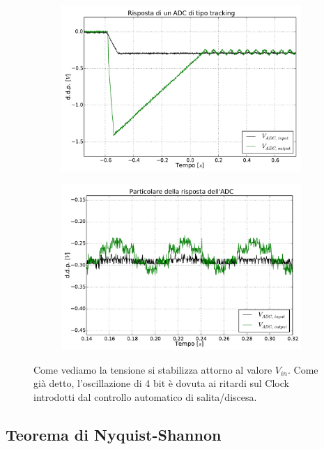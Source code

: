 \begin{figure}[htpc]
\centering
	\begin{subfigure}[hc]{.49\textwidth}
		\centering
		\includegraphics[width=.99\textwidth]{../E13/latex/tracker.pdf}
		\caption{}
		\label{gr13:track}
        \end{subfigure}%
        \begin{subfigure}[hc]{.49\textwidth}
		\centering
		\includegraphics[width=.99\textwidth]{../E13/latex/zoom.pdf}
		\caption{}
		\label{gr13:zoom}
        \end{subfigure}
\caption{Come vediamo la tensione si stabilizza attorno al valore $V_{in}$. Come già detto, l'oscillazione di 4 bit è dovuta ai ritardi sul Clock introdotti dal controllo automatico di salita/discesa.}
\end{figure}

\subsection{Teorema di Nyquist-Shannon}

